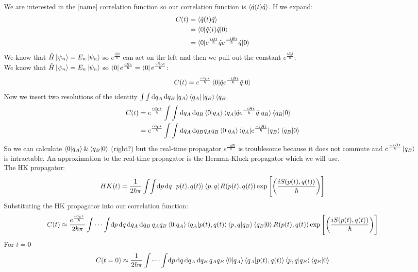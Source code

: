 \documentclass[12pt,letterpaper,oneside,final,titlepage]{article}               %
\numberwithin{equation}{section} %
\newcommand{\emiHt}{e^{\frac{-i\hat{H}t}{\hbar}}}
\newcommand{\eiHt}{e^{\frac{i\hat{H}t}{\hbar}}}
\newcommand{\expb}[1]{\ensuremath{\exp{\left[ #1 \right]}}}
\begin{document}
We are interested in the [name] correlation function so our correlation function is $\braket{\hat{q}(t)\hat{q}}$. 
If we expand:
\begin{align}
    C(t) &= \braket{\hat{q}(t)\hat{q}}
    \\   &= \braket{0|\hat{q}(t)\hat{q}|0}
    \\   &= \braket{0|\eiHt\hat{q}\emiHt\hat{q}|0}
\end{align}
We know that $\hat{H}\ket{\psi_{n}} = E_{n}\ket{\psi_{n}}$ so $\eiHt$ can act on the left and 
then we pull out the constant $e^{\frac{iE_{0}t}{\hbar}}$:\\
We know that $\hat{H}\ket{\psi_{n}} = E_{n}\ket{\psi_{n}}$ so $\bra{0}\eiHt = \bra{0}e^{\frac{iE_{0}t}{\hbar}}$:
\begin{equation}
    C(t) = e^{\frac{iE_{0}t}{\hbar}}\braket{0|\hat{q}\emiHt\hat{q}|0}
\end{equation}
Now we insert two resolutions of the identity
$\int\int \dif q_{A}\dif q_{B} \ket{q_{A}}\bra{q_{A}}\ket{q_{B}}\bra{q_{B}}$
\begin{align}
    C(t) &= e^{\frac{iE_{0}t}{\hbar}}\int\int \dif q_{A}\dif q_{B} 
    \braket{0|q_{A}}\braket{q_{A}|\hat{q}\emiHt\hat{q}|q_{B}}\braket{q_{B}|0}
    \\   &= e^{\frac{iE_{0}t}{\hbar}}\int\int \dif q_{A}\dif q_{B} 
    q_{A}q_{B}\braket{0|q_{A}}\braket{q_{A}|\emiHt|q_{B}}\braket{q_{B}|0}
\end{align}
So we can calculate $\braket{0|q_{A}} \& \braket{q_{B}|0}$ (right?) but the real-time propagator $\emiHt$ is troublesome because 
it does not commute and $\emiHt\ket{q_{B}}$ is intractable. 
An approximation to the real-time propagator is the Herman-Kluck propagator which we will use. \\ The HK propagator:
\begin{equation}
    HK(t) = \frac{1}{2\hbar\pi}\int\!\int \!\dif p\,\!\dif q\, 
    \ket{p(t), q(t)}\bra{p,q} R(p(t),q(t))
    \expb{\left(\frac{iS(p(t),q(t))}{\hbar}\right)}
\end{equation}
Substituting the HK propagator into our correlation function:
\begin{equation*}
    C(t) \approx \frac{e^{\frac{iE_{0}t}{\hbar}}}{2\hbar\pi}\int\cdots\int\! \dif p\,\!\dif q\,\!\dif q_{A}\,\!\dif q_{B}\,
    q_{A}q_{B}\braket{0|q_{A}}\braket{q_{A}|p(t), q(t)} \braket{p,q|q_{B}}\braket{q_{B}|0}
    R(p(t),q(t)) \expb{\left(\frac{iS(p(t),q(t))}{\hbar}\right)}
\end{equation*}
For $t=0$
\begin{equation*}
    C(t=0) \approx \frac{1}{2\hbar\pi}\int\cdots\int\! \dif p\,\!\dif q\,\!\dif q_{A}\,\!\dif q_{B}\,
    q_{A}q_{B}\braket{0|q_{A}}\braket{q_{A}|p(t), q(t)} \braket{p,q|q_{B}}\braket{q_{B}|0}
\end{equation*}
\end{document}
